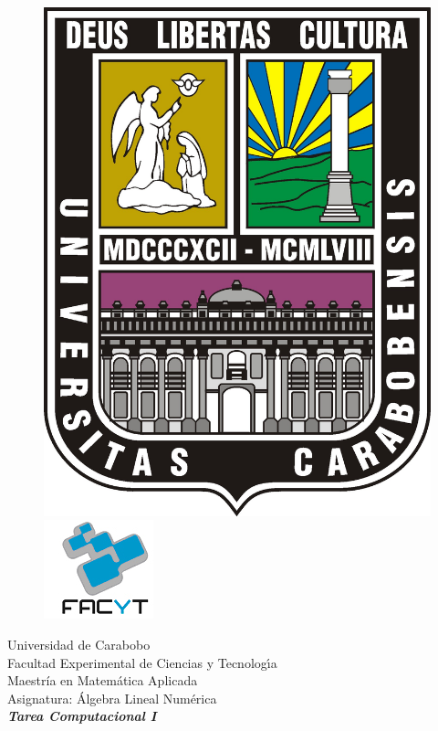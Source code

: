 \documentclass[12pt]{article}
\begin{document}

\begin{center}

\begin{figure}[!h]
\includegraphics[scale=0.2]{LogoUC.jpg}
  \label{fig:hoo}
   \hspace{14cm}\includegraphics[scale=0.6]{LogoFaCyT.jpg}
\end{figure}
 \vspace{-2,5cm}
Universidad de Carabobo \\ Facultad Experimental de Ciencias y
Tecnolog\'{\i}a \\ Maestr\'ia en Matem\'atica Aplicada\\ Asignatura:
\'Algebra Lineal Num\'erica\\
\vspace{1cm} {\it\bf\large Tarea Computacional I}\\
\end{center}
\end{document}
